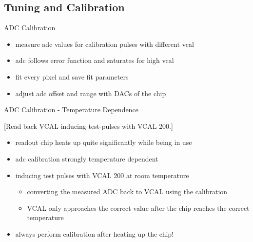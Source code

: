 \subsection{Tuning and Calibration}
\begin{frame}{ADC Calibration}
	
	
	\vspace*{-10pt}

	\begin{itemize}\itemfill 
		\item<1-> measure adc values for calibration pulses with different vcal
		\item<1-> adc follows error function and saturates for high vcal
		\item<2> fit every pixel and save fit parameters
		\item<2> adjust adc offset and range with DACs of the chip
	\end{itemize}

\end{frame}


\begin{frame}{ADC Calibration - Temperature Dependence}
    
    \vspace*{-3ex}
    [Read back VCAL inducing test-pulses with VCAL 200.]
    \vspace*{-2ex}

    \begin{itemize}\itemfill 
        \item readout chip heats up quite significantly while being in use
        \item adc calibration strongly temperature dependent 
        \item inducing test pulses with VCAL 200 at room temperature
        \begin{itemize}
          \item converting the measured ADC back to VCAL using the calibration
          \item VCAL only approaches the correct value after the chip reaches the correct temperature
        \end{itemize}
        \item \ra always perform calibration after heating up the chip!
    \end{itemize}

\end{frame}

